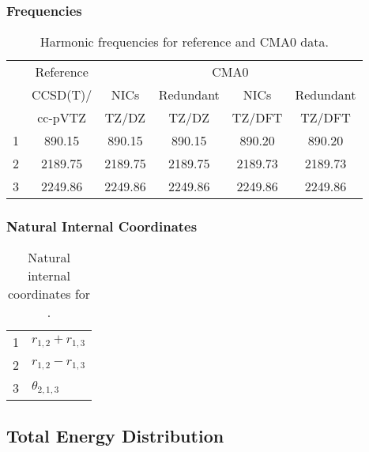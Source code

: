 \documentclass[10pt,oneside]{article}
\begin{document}
\begin{table}[h!]
\subsubsection*{Frequencies}
\centering
\caption{Harmonic frequencies for reference and CMA0 data.}
\begin{tabular}{cccccc}
\toprule
{} & Reference & \multicolumn{4}{c}{CMA0} \\
{} &  CCSD(T)/ &    NICs &  Redundant &    NICs & Redundant \\
{} &   cc-pVTZ &   TZ/DZ &      TZ/DZ &  TZ/DFT &    TZ/DFT \\
\midrule
1 &    890.15 &  890.15 &     890.15 &  890.20 &    890.20 \\
2 &   2189.75 & 2189.75 &    2189.75 & 2189.73 &   2189.73 \\
3 &   2249.86 & 2249.86 &    2249.86 & 2249.86 &   2249.86 \\
\bottomrule
\end{tabular}
\end{table}

\begin{table}[h!]
\subsubsection*{Natural Internal Coordinates}
\centering
\caption{Natural internal coordinates for .}
\small
\begin{tabular}{ll}
\toprule
  1   & $r_{1,2} + r_{1,3}$ \\
  2   & $r_{1,2} - r_{1,3}$ \\
  3   & $\theta_{2,1,3}$ \\
\bottomrule
\end{tabular}
\end{table}

\begin{table}
\subsection*{Total Energy Distribution}
\centering\end{table}

\clearpage

\subsection{}
\end{document}
